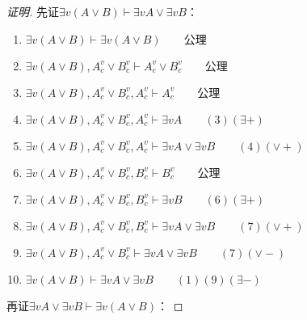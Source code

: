\documentclass{article}
\begin{document}
\begin{CJK*}{UTF8}{gbsn}
\begin{proof}[证明]
    先证$\exists v(A\lor B)\vdash \exists v A\lor \exists v B$：

    \begin{enumerate}
      \item $\exists v(A\lor B)\vdash \exists v (A\lor B)\qquad \text{公理}$
      \item $\exists v(A\lor B),A_c^v\lor B_c^v\vdash A_c^v\lor B_c^v\qquad \text{公理}$
      \item $\exists v(A\lor B),A_c^v\lor B_c^v, A_c^v\vdash A_c^v\qquad \text{公理}$
      \item $\exists v(A\lor B),A_c^v\lor B_c^v, A_c^v\vdash \exists v A\qquad (3)(\exists +)$
      \item $\exists v(A\lor B),A_c^v\lor B_c^v, A_c^v\vdash \exists v A \lor \exists v B\qquad (4)(\lor +)$
      \item $\exists v(A\lor B),A_c^v\lor B_c^v, B_c^v\vdash B_c^v\qquad \text{公理}$
      \item $\exists v(A\lor B),A_c^v\lor B_c^v, B_c^v\vdash \exists v B\qquad (6)(\exists +)$
      \item $\exists v(A\lor B),A_c^v\lor B_c^v, B_c^v\vdash \exists v A \lor \exists v B\qquad (7)(\lor +)$
      \item $\exists v(A\lor B),A_c^v\lor B_c^v\vdash \exists v A \lor \exists v B\qquad (7)(\lor -)$
      \item $\exists v(A\lor B)\vdash \exists v A \lor \exists v B\qquad (1)(9)(\exists -)$
    \end{enumerate}

    再证$\exists v A\lor \exists v B\vdash \exists v(A\lor B)$：


\end{proof}
\end{CJK*}
\end{document}
